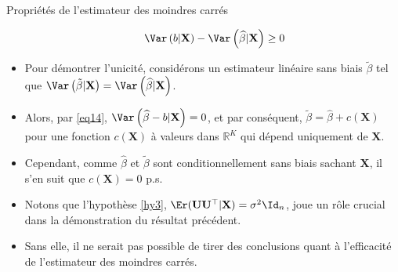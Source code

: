 \begin{frame}[allowframebreaks]{Propriétés de l'estimateur des moindres carrés}
\begin{itemize}
\begin{align*}
\ \Var\left(b | \mathbf{X}\right) - \Var\left(\widehat{\beta}| \mathbf{X}\right) \geq 0
\end{align*}
\item Pour démontrer l'unicité, considérons un estimateur linéaire sans biais $\tilde{\beta}$ tel que $\Var\left(\tilde{\beta}|\mathbf{X}\right)=\Var\left(\widehat{\beta}|\mathbf{X}\right)$. 
\item Alors, par \eqref{eq14}, $\Var\left(\widehat{\beta} - b | \mathbf{X}\right) = 0$, et par conséquent, $\tilde{\beta} = \widehat{\beta}+c(\mathbf{X})$ pour une fonction $c(\mathbf{X})$ à valeurs dans $\mathbb{R}^K$ qui dépend uniquement de $\mathbf{X}$. 
\item Cependant, comme $\widehat{\beta}$ et $\tilde{\beta}$ sont conditionnellement sans biais sachant $\mathbf{X}$, il s'en suit que $c(\mathbf{X}) = 0$  p.s.
\item Notons que l'hypothèse \ref{hy3}, $\Er(\mathbf{U}\mathbf{U}^\top|\mathbf{X})=\sigma^2\Id_n$, joue un rôle crucial dans la démonstration du résultat précédent.
\item Sans elle, il ne serait pas possible de tirer des conclusions quant à  l'efficacité de l'estimateur des moindres carrés.
\end{itemize}
\end{frame}

